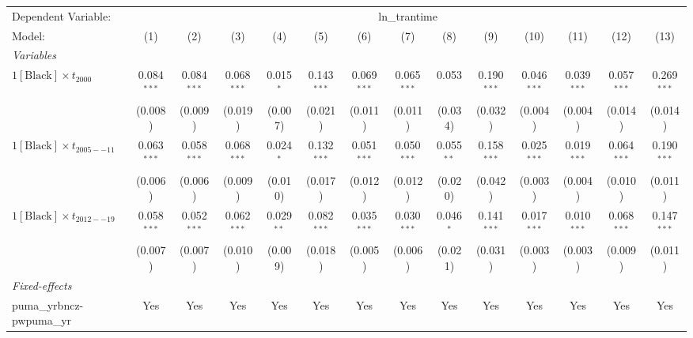 
\begingroup
\centering
\begin{tabular}{lccccccccccccc}
   \tabularnewline \midrule \midrule
   Dependent Variable: & \multicolumn{13}{c}{ln\_trantime}\\
   Model:                                  & (1)           & (2)           & (3)           & (4)          & (5)           & (6)           & (7)           & (8)          & (9)           & (10)          & (11)                  & (12)          & (13)\\  
   \midrule
   \emph{Variables}\\
   $1[\text{Black}] \times t_{2000}$       & 0.084$^{***}$ & 0.084$^{***}$ & 0.068$^{***}$ & 0.015$^{*}$  & 0.143$^{***}$ & 0.069$^{***}$ & 0.065$^{***}$ & 0.053        & 0.190$^{***}$ & 0.046$^{***}$ & 0.039$^{***}$         & 0.057$^{***}$ & 0.269$^{***}$\\   
                                           & (0.008)       & (0.009)       & (0.019)       & (0.007)      & (0.021)       & (0.011)       & (0.011)       & (0.034)      & (0.032)       & (0.004)       & (0.004)               & (0.014)       & (0.014)\\   
   $1[\text{Black}] \times t_{2005--11}$   & 0.063$^{***}$ & 0.058$^{***}$ & 0.068$^{***}$ & 0.024$^{*}$  & 0.132$^{***}$ & 0.051$^{***}$ & 0.050$^{***}$ & 0.055$^{**}$ & 0.158$^{***}$ & 0.025$^{***}$ & 0.019$^{***}$         & 0.064$^{***}$ & 0.190$^{***}$\\   
                                           & (0.006)       & (0.006)       & (0.009)       & (0.010)      & (0.017)       & (0.012)       & (0.012)       & (0.020)      & (0.042)       & (0.003)       & (0.004)               & (0.010)       & (0.011)\\   
   $1[\text{Black}] \times t_{2012--19}$   & 0.058$^{***}$ & 0.052$^{***}$ & 0.062$^{***}$ & 0.029$^{**}$ & 0.082$^{***}$ & 0.035$^{***}$ & 0.030$^{***}$ & 0.046$^{*}$  & 0.141$^{***}$ & 0.017$^{***}$ & 0.010$^{***}$         & 0.068$^{***}$ & 0.147$^{***}$\\   
                                           & (0.007)       & (0.007)       & (0.010)       & (0.009)      & (0.018)       & (0.005)       & (0.006)       & (0.021)      & (0.031)       & (0.003)       & (0.003)               & (0.009)       & (0.011)\\   
   \midrule
   \emph{Fixed-effects}\\
   puma\_yrbncz-pwpuma\_yr                 & Yes           & Yes           & Yes           & Yes          & Yes           & Yes           & Yes           & Yes          & Yes           & Yes           & Yes                   & Yes           & Yes\\  

\end{tabular}
